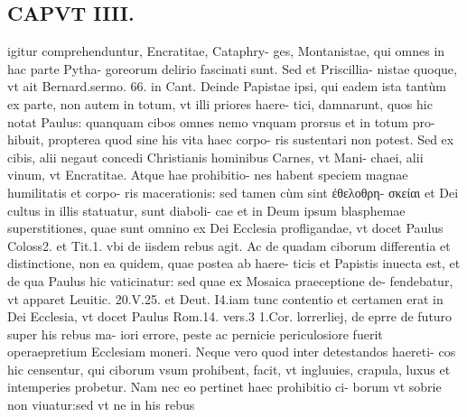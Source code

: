 \documentclass{article}
\begin{document}
\begin{pages}
\section*{CAPVT  IIII. }
\marginpar{[ p.189 ]}\pstart igitur comprehenduntur, Encratitae, Cataphry- ges, Montanistae, qui omnes in hac parte Pytha- goreorum delirio fascinati sunt. Sed et Priscillia- nistae quoque, vt ait Bernard.sermo. 66. in Cant. Deinde Papistae ipsi, qui eadem ista tantùm ex parte, non autem in totum, vt illi priores haere- tici, damnarunt, quos hic notat Paulus: quanquam cibos omnes nemo vnquam prorsus et in totum pro- hibuit, propterea quod sine his vita haec corpo- ris sustentari non potest. Sed ex cibis, alii negaut concedi Christianis hominibus Carnes, vt Mani- chaei, alii vinum, vt Encratitae. Atque  hae prohibitio- nes habent speciem magnae humilitatis et corpo- ris macerationis: sed tamen cùm sint ἐθελοθρη- σκείαι et Dei cultus in illis statuatur, sunt diaboli- cae et in Deum ipsum blasphemae superstitiones, quae sunt omnino ex Dei Ecclesia profligandae, vt docet Paulus Coloss2. et Tit.1. vbi de iisdem rebus agit. Ac de quadam ciborum differentia et distinctione, non ea quidem, quae postea ab haere- ticis et Papistis inuecta est, et de qua Paulus hic vaticinatur: sed quae ex Mosaica praeceptione de- fendebatur, vt apparet Leuitic. 20.V.25. et Deut. I4.iam tunc contentio et certamen erat in Dei Ecclesia, vt docet Paulus Rom.14. vers.3 1.Cor. lorrerliej, de eprre de futuro super his rebus ma- iori errore, peste ac pernicie periculosiore fuerit operaepretium Ecclesiam moneri. Neque vero quod inter detestandos haereti- cos hic censentur, qui ciborum vsum prohibent, facit, vt ingluuies, crapula, luxus et intemperies probetur. Nam nec eo pertinet haec prohibitio ci- borum vt sobrie non viuatur:sed vt ne in his rebus  \pend

\end{pages}
\end{document}
